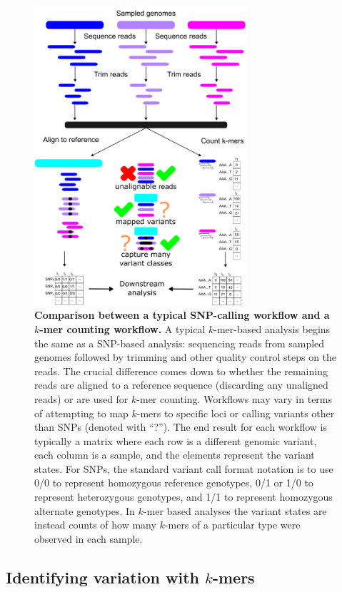 \documentclass[12pt]{article}
\begin{document}
\begin{figure}[H]
    \centering
    \includegraphics[width=0.7\textwidth]{figures/chapter_3/kmer_vs_snp_workflow.png}
    \caption{\textbf{Comparison between a typical SNP-calling workflow and a $k$-mer counting workflow.} A typical $k$-mer-based analysis begins the same as a SNP-based analysis: sequencing reads from sampled genomes followed by trimming and other quality control steps on the reads. The crucial difference comes down to whether the remaining reads are aligned to a reference sequence (discarding any unaligned reads) or are used for $k$-mer counting. Workflows may vary in terms of attempting to map $k$-mers to specific loci or calling variants other than SNPs (denoted with ``?''). The end result for each workflow is typically a matrix where each row is a different genomic variant, each column is a sample, and the elements represent the variant states. For SNPs, the standard variant call format notation is to use 0/0 to represent homozygous reference genotypes, 0/1 or 1/0 to represent heterozygous genotypes, and 1/1 to represent homozygous alternate genotypes. In $k$-mer based analyses the variant states are instead counts of how many $k$-mers of a particular type were observed in each sample.}
    \label{fig:kvs}
\end{figure}

\subsection*{Identifying variation with $k$-mers}
\end{document}
